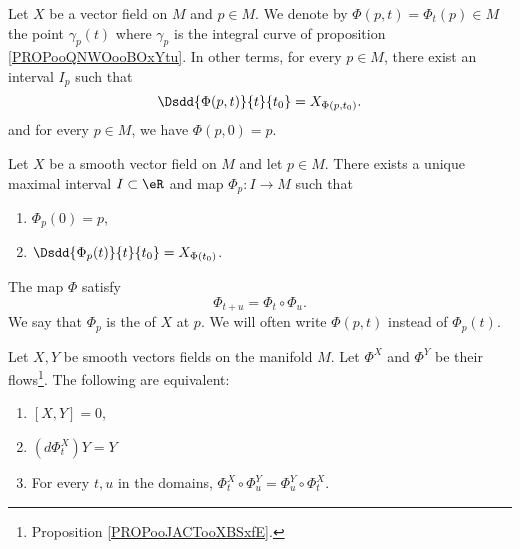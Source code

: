 Let \( X\) be a vector field on \( M\) and \( p\in M\). We denote by \( \Phi(p,t)=\Phi_t(p)\in M\) the point \( \gamma_p(t)\) where \( \gamma_p\) is the integral curve of proposition \ref{PROPooQNWOooBOxYtu}. In other terms, for every \( p\in M\), there exist an interval \( I_p\) such that
\begin{equation}
    \Dsdd{ \Phi(p,t) }{t}{t_0}=X_{\Phi(p,t_0)}.
\end{equation}
and for every \( p\in M\), we have \( \Phi(p,0)=p\).


\begin{proposition}       \label{PROPooJACTooXBSxfE}
    Let \( X\) be a smooth vector field on \( M\) and let \( p\in M\). There exists a unique maximal interval \( I\subset \eR\) and map \( \Phi_p\colon I\to M\) such that
    \begin{enumerate}
        \item
            \( \Phi_p(0)=p\),
        \item
            \( \Dsdd{ \Phi_p(t) }{t}{t_0}=X_{\Phi(t_0)}\).
    \end{enumerate}
    The map \( \Phi\) satisfy
    \begin{equation}        \label{EQooCHYXooCbECRN}
        \Phi_{t+u}=\Phi_t\circ \Phi_u.
    \end{equation}
    We say that \( \Phi_p\) is the  of \( X\) at \( p\). We will often write \( \Phi(p,t)\) instead of \( \Phi_p(t)\).
\end{proposition}

\begin{proposition}       \label{PROPooDPXIooTvXOIP}
    Let \( X,Y\) be smooth vectors fields on the manifold \( M\). Let \( \Phi^X\) and \( \Phi^Y\) be their flows\footnote{Proposition \ref{PROPooJACTooXBSxfE}.}. The following are equivalent:
    \begin{enumerate}
        \item
            \( [X,Y]=0\),
        \item
            \( (d\Phi_t^X)Y=Y\)
        \item
            For every \( t,u\) in the domains, \( \Phi_t^X\circ\Phi_u^Y=\Phi^Y_u\circ\Phi^X_t\).
    \end{enumerate}
\end{proposition}

